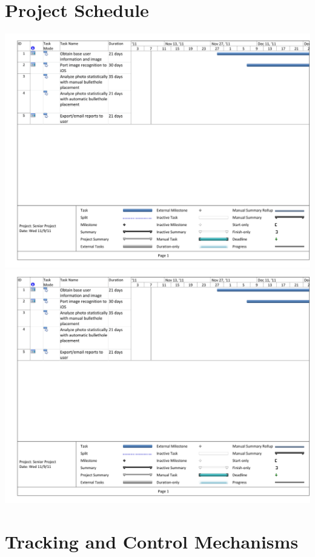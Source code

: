 \documentclass[11pt]{article}
\begin{document}
\section{Project Schedule}
\includegraphics[scale=.8,angle=270,page=1]{ganttchart}
\newpage
\noindent
\includegraphics[scale=.8,angle=270,page=2]{ganttchart}
\section{Tracking and Control Mechanisms}

\end{document}
